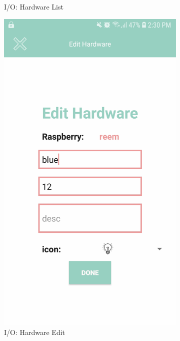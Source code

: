 \documentclass[12pt]{paper}
\begin{document}
\begin{figure}[H]
\begin{subfigure}[b]{.35\linewidth}
				\caption{I/O: Hardware List}
			\end{subfigure}
			\begin{subfigure}[b]{.35\linewidth}
				\includegraphics[width=\linewidth]{img/output_hardware_edit.jpg}
				\caption{I/O: Hardware Edit}
			\end{subfigure}
			\begin{subfigure}[b]{.35\linewidth}

\end{subfigure}
\end{figure}
\end{document}
